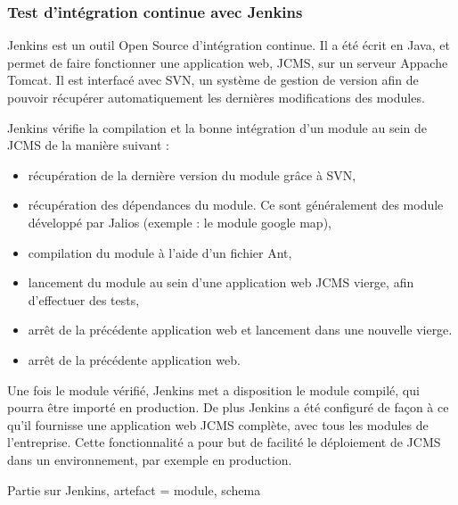 \documentclass[12pt,a4paper]{article}
\begin{document}
\subsubsection{Test d'intégration continue avec Jenkins}
Jenkins est un outil Open Source d'intégration continue. Il a été écrit en Java, et permet de faire fonctionner une application web, \gls{JCMS}, sur un serveur Appache Tomcat. Il est interfacé avec  \gls{SVN}, un système de gestion de version afin de pouvoir récupérer automatiquement les dernières modifications des modules.\par 
Jenkins vérifie la compilation et la bonne intégration d'un module au sein de \gls{JCMS} de la manière suivant :
\begin{itemize}
\item récupération de la dernière version du module grâce à \gls{SVN},
\item récupération des dépendances du module. Ce sont généralement des module développé par Jalios (exemple : le module google map),
\item compilation du module à l'aide d'un fichier Ant,
\item lancement du module au sein d'une application web \gls{JCMS} vierge, afin d'effectuer des tests,
\item arrêt de la précédente application web et lancement dans une nouvelle vierge.
\item arrêt de la précédente application web.
\end{itemize}\par 
Une fois le module vérifié, Jenkins met a disposition le module compilé, qui pourra être importé en production. De plus Jenkins a été configuré de façon à ce qu'il fournisse une application web \gls{JCMS} complète, avec tous les modules de l'entreprise. Cette fonctionnalité a pour but de facilité le déploiement de \gls{JCMS} dans un environnement, par exemple en production.\par 
\medskip
Partie sur Jenkins, artefact = module, schema

\newpage
\end{document}
